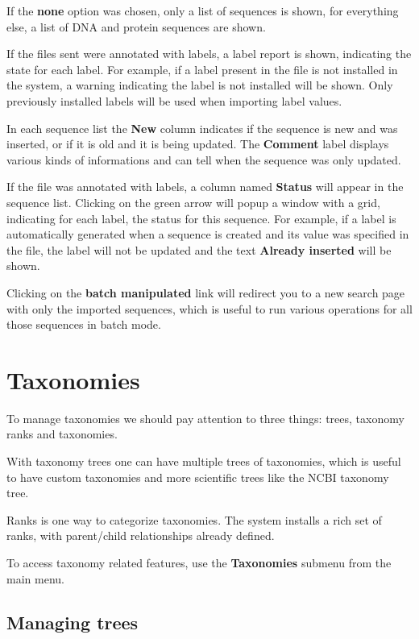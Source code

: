 If the \textbf{none} option was chosen, only a list of sequences is shown, for everything else,
a list of DNA and protein sequences are shown.

If the files sent were annotated with labels, a label report is shown, indicating the state for each label.
For example, if a label present in the file is not installed in the system, a warning indicating the label
is not installed will be shown. Only previously installed labels will be used when importing label values.

In each sequence list the \textbf{New} column indicates if the sequence is new and was inserted, or if it is old
and it is being updated. The \textbf{Comment} label displays various kinds of informations and can tell when
the sequence was only updated.

If the file was annotated with labels, a column named \textbf{Status} will appear in the sequence list. Clicking
on the green arrow will popup a window with a grid, indicating for each label, the status for this sequence.
For example, if a label is automatically generated when a sequence is created and its value was specified in the file,
the label will not be updated and the text \textbf{Already inserted} will be shown.

Clicking on the \textbf{batch manipulated} link will redirect you to a new search page with only the imported sequences,
which is useful to run various operations for all those sequences in batch mode.


\section{Taxonomies}

To manage taxonomies we should pay attention to three things: trees, taxonomy ranks and taxonomies.

With taxonomy trees one can have multiple trees of taxonomies, which is useful to have custom
taxonomies and more scientific trees like the NCBI taxonomy tree.

Ranks is one way to categorize taxonomies. The system installs a rich set of ranks,
with parent/child relationships already defined.

To access taxonomy related features, use the \textbf{Taxonomies} submenu from the main menu.

\subsection{Managing trees}

